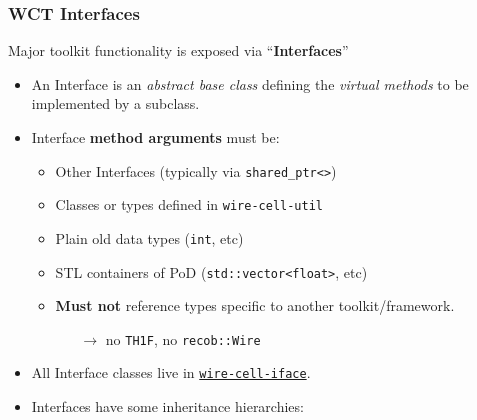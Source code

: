 \documentclass[xcolor=dvipsnames]{beamer}
\begin{document}
\begin{frame}
  \frametitle{WCT Interfaces}

  Major toolkit functionality is exposed via ``\textbf{Interfaces}''

  \begin{itemize}
  \item An Interface is an \textit{abstract base class}
    defining the \textit{virtual methods} to be implemented by a subclass.
  \item Interface \textbf{method arguments} must be:
    \begin{itemize}\footnotesize
    \item Other Interfaces (typically via \texttt{shared\_ptr<>})
    \item Classes or types defined in \texttt{wire-cell-util}
    \item Plain old data types (\texttt{int}, etc)
    \item STL containers of PoD (\texttt{std::vector<float>}, etc)
    \item \textbf{Must not} reference types specific to another toolkit/framework.
      \begin{itemize}\scriptsize
      \item[$\to$] no \texttt{TH1F}, no \texttt{recob::Wire}
      \end{itemize}
    \end{itemize}
  \item All Interface classes live in
    \href{https://github.com/WireCell/wire-cell-iface}{\texttt{wire-cell-iface}}.
  \item Interfaces have some inheritance hierarchies:
  \end{itemize}
\end{frame}
\end{document}
